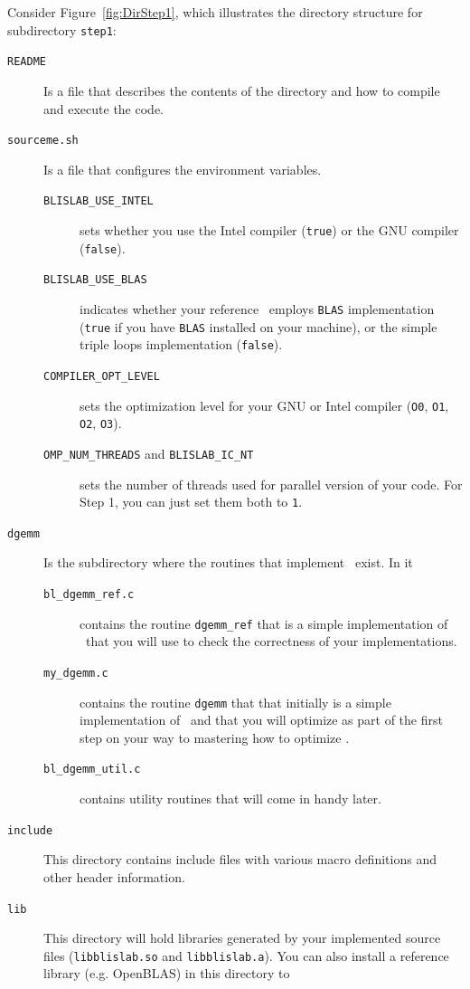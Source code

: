 Consider Figure~\ref{fig:DirStep1}, which illustrates the directory
structure for subdirectory {\tt step1}:
\begin{description}
\item[{\tt README}]
Is a file that describes the contents of the directory and how to compile and execute the code.
\item[{\tt sourceme.sh}]
Is a file that configures the environment variables.
\begin{description}
\item[{\tt BLISLAB\_USE\_INTEL}] sets whether you use the Intel compiler ({\tt true}) or the GNU compiler ({\tt false}).
\item[{\tt BLISLAB\_USE\_BLAS}] indicates whether your reference \Gemm\ employs {\tt BLAS} implementation ({\tt true} if you have {\tt BLAS} installed on your machine), or the simple triple loops implementation ({\tt false}).
\item[{\tt COMPILER\_OPT\_LEVEL}] sets the optimization level for your GNU or Intel compiler ({\tt O0}, {\tt O1}, {\tt O2}, {\tt O3}).
\item[{\tt OMP\_NUM\_THREADS} and {\tt BLISLAB\_IC\_NT}] sets the number of threads used for parallel version of your code. For Step 1, you can just set them both to {\tt 1}.
\end{description}
\item[{\tt dgemm}]
Is the subdirectory where the routines that implement \Gemm\ exist.
In it
\begin{description}
\item[{\tt bl\_dgemm\_ref.c}] contains the routine {\tt dgemm\_ref} that
  is a simple implementation of \Gemm\ that you will use to check the
  correctness of your implementations.
\item[{\tt my\_dgemm.c}] contains the routine {\tt dgemm} that
  that initially is a simple implementation of \Gemm\ and that you will optimize as part of the first step on your way to mastering how to optimize \Gemm.
\item[{\tt bl\_dgemm\_util.c}] contains utility routines that will come in handy later.
\end{description}
\item[{\tt include}]
This directory contains 
include files with various macro definitions and 
other header information.
\item[{\tt lib}] This directory will hold libraries generated by your implemented source files ({\tt libblislab.so} and {\tt libblislab.a}). You can also install a reference library (e.g. OpenBLAS) in this directory to

\end{description}
